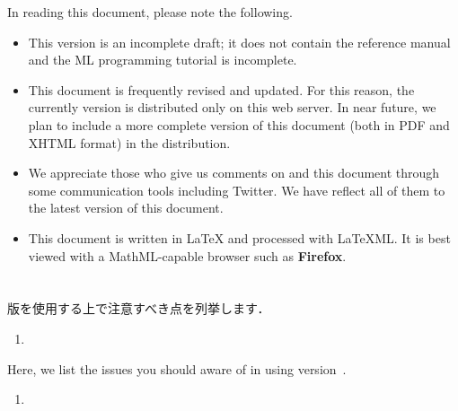In reading this document, please note the following.
\begin{itemize}
\item 
	This \version{} version is an incomplete draft; it does not
contain the reference manual and the ML programming tutorial is
incomplete.

\item 
	This document is frequently revised and updated.
	For this reason, the currently version is distributed only on
this web server.
	In near future, we plan to include a more complete version of
this document (both in PDF and XHTML format) in the \smlsharp{}
distribution.

\item
	We appreciate those who give us comments on \smlsharp{} and
this document through some communication tools including Twitter.
	We have reflect all of them to the latest version of this
document.

\item 
	This document is written in LaTeX and processed with LaTeXML.
	It is best viewed with a MathML-capable browser such as {\bf Firefox}.
\end{itemize}
\fi%

\chapter{}

\ifjp%

\smlsharp{}\version{}版を使用する上で注意すべき点を列挙します．
\begin{enumerate}
\item
\end{enumerate}
\else%

Here, we list the issues you should aware of in using \smlsharp{}
version~\version{}.
\begin{enumerate}
\item
\end{enumerate}
\fi%



\chapter{}
\label{chap:intro}

